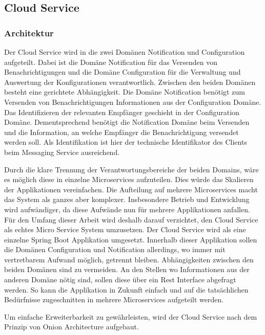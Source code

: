 
\subsection{Cloud Service}\label{subsec:cloud-service}

\subsubsection{Architektur}

Der Cloud Service wird in die zwei Domänen Notification und Configuration aufgeteilt.
Dabei ist die Domäne Notification für das Versenden von Benachrichtigungen
und die Domäne Configuration für die Verwaltung und Auswertung der Konfigurationen verantwortlich.
Zwischen den beiden Domänen besteht eine gerichtete Abhängigkeit.
Die Domäne Notification benötigt zum Versenden von Benachrichtigungen Informationen aus der Configuration Domäne.
Das Identifizieren der relevanten Empfänger geschieht in der Configuration Domäne.
Dementsprechend benötigt die Notification Domäne beim Versenden und die Information, an welche Empfänger die Benachrichtigung versendet werden soll.
Als Identifikation ist hier der technische Identifikator des Clients beim Messaging Service ausreichend.

Durch die klare Trennung der Verantwortungsbereiche der beiden Domains, wäre es möglich diese in einzelne Microservices aufzuteilen.
Dies würde das Skalieren der Applikationen vereinfachen.
Die Aufteilung auf mehrere Microservices macht das System als ganzes aber komplexer.
Insbesondere Betrieb und Entwicklung wird aufwändiger, da diese Aufwände nun für mehrere Applikationen anfallen.
Für den Umfang dieser Arbeit wird deshalb darauf verzichtet, den Cloud Service als echtes Micro Service System umzusetzen.
Der Cloud Service wird als eine einzelne Spring Boot Applikation umgesetzt.
Innerhalb dieser Applikation sollen die Domänen Configuration und Notification allerdings, wo immer mit vertretbarem Aufwand möglich, getrennt bleiben.
Abhängigkeiten zwischen den beiden Domänen sind zu vermeiden.
An den Stellen wo Informationen aus der anderen Domäne nötig sind, sollen diese über ein Rest Interface abgefragt werden.
So kann die Applikation in Zukunft einfach und auf die tatsächlichen Bedürfnisse zugeschnitten in mehrere Microservices aufgeteilt werden.

Um einfache Erweiterbarkeit zu gewährleisten, wird der Cloud Service nach dem Prinzip von Onion Architecture aufgebaut.

